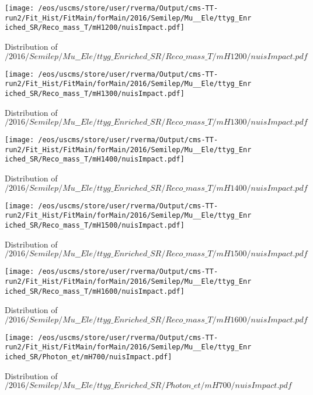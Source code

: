 \begin{figure}
\centering
\texttt{[image: /eos/uscms/store/user/rverma/Output/cms-TT-run2/Fit\_Hist/FitMain/forMain/2016/Semilep/Mu\_\_Ele/ttyg\_Enriched\_SR/Reco\_mass\_T/mH1200/nuisImpact.pdf]}
\caption{Distribution of $/2016/Semilep/Mu\_\_Ele/ttyg\_Enriched\_SR/Reco\_mass\_T/mH1200/nuisImpact.pdf$}
\end{figure}

\begin{figure}
\centering
\texttt{[image: /eos/uscms/store/user/rverma/Output/cms-TT-run2/Fit\_Hist/FitMain/forMain/2016/Semilep/Mu\_\_Ele/ttyg\_Enriched\_SR/Reco\_mass\_T/mH1300/nuisImpact.pdf]}
\caption{Distribution of $/2016/Semilep/Mu\_\_Ele/ttyg\_Enriched\_SR/Reco\_mass\_T/mH1300/nuisImpact.pdf$}
\end{figure}

\begin{figure}
\centering
\texttt{[image: /eos/uscms/store/user/rverma/Output/cms-TT-run2/Fit\_Hist/FitMain/forMain/2016/Semilep/Mu\_\_Ele/ttyg\_Enriched\_SR/Reco\_mass\_T/mH1400/nuisImpact.pdf]}
\caption{Distribution of $/2016/Semilep/Mu\_\_Ele/ttyg\_Enriched\_SR/Reco\_mass\_T/mH1400/nuisImpact.pdf$}
\end{figure}

\begin{figure}
\centering
\texttt{[image: /eos/uscms/store/user/rverma/Output/cms-TT-run2/Fit\_Hist/FitMain/forMain/2016/Semilep/Mu\_\_Ele/ttyg\_Enriched\_SR/Reco\_mass\_T/mH1500/nuisImpact.pdf]}
\caption{Distribution of $/2016/Semilep/Mu\_\_Ele/ttyg\_Enriched\_SR/Reco\_mass\_T/mH1500/nuisImpact.pdf$}
\end{figure}

\begin{figure}
\centering
\texttt{[image: /eos/uscms/store/user/rverma/Output/cms-TT-run2/Fit\_Hist/FitMain/forMain/2016/Semilep/Mu\_\_Ele/ttyg\_Enriched\_SR/Reco\_mass\_T/mH1600/nuisImpact.pdf]}
\caption{Distribution of $/2016/Semilep/Mu\_\_Ele/ttyg\_Enriched\_SR/Reco\_mass\_T/mH1600/nuisImpact.pdf$}
\end{figure}

\begin{figure}
\centering
\texttt{[image: /eos/uscms/store/user/rverma/Output/cms-TT-run2/Fit\_Hist/FitMain/forMain/2016/Semilep/Mu\_\_Ele/ttyg\_Enriched\_SR/Photon\_et/mH700/nuisImpact.pdf]}
\caption{Distribution of $/2016/Semilep/Mu\_\_Ele/ttyg\_Enriched\_SR/Photon\_et/mH700/nuisImpact.pdf$}
\end{figure}

